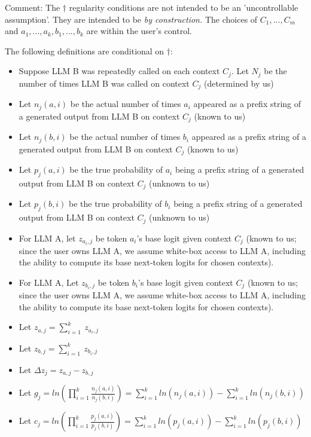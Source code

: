 \documentclass{article}
\begin{document}
Comment: The $\displaystyle \dagger $ regularity conditions are not intended to be an 'uncontrollable assumption'. They are intended to be \textit{by construction.} The choices of $\displaystyle C_{1} ,...,C_{m}$ and $\displaystyle a_{1} ,...,a_{k} ,b_{1} ,...,b_{k}$ are within the user's control.


The following definitions are conditional on $\displaystyle \dagger $:

\begin{itemize}
\item Suppose LLM B was repeatedly called on each context $\displaystyle C_{j}$. Let $\displaystyle N_{j}$ be the number of times LLM B was called on context $\displaystyle C_{j}$ (determined by us)
\item Let $\displaystyle n_{j}( a,i)$ be the actual number of times $\displaystyle a_{i}$ appeared as a prefix string of a generated output from LLM B on context $\displaystyle C_{j}$ (known to us)
\item Let $\displaystyle n_{j}( b,i)$ be the actual number of times $\displaystyle b_{i}$ appeared as a prefix string of a generated output from LLM B on context $\displaystyle C_{j}$ (known to us)
\item Let $\displaystyle p_{j}( a,i)$ be the true probability of $\displaystyle a_{i}$ being a prefix string of a generated output from LLM B on context $\displaystyle C_{j}$ (unknown to us)
\item Let $\displaystyle p_{j}( b,i)$ be the true probability of $\displaystyle b_{i}$ being a prefix string of a generated output from LLM B on context $\displaystyle C_{j}$ (unknown to us)
\item For LLM A, let $\displaystyle z_{a_{i} ,j}$ be token $\displaystyle a_{i}$'s base logit given context $\displaystyle C_{j}$ (known to us; since the user owns LLM A, we assume white-box access to LLM A, including the ability to compute its base next-token logits for chosen contexts).
\item For LLM A, Let $\displaystyle z_{b_{i} ,j}$ be token $\displaystyle b_{i}$'s base logit given context $\displaystyle C_{j}$ (known to us; since the user owns LLM A, we assume white-box access to LLM A, including the ability to compute its base next-token logits for chosen contexts).
\item Let $\displaystyle z_{a,j} =\sum _{i=1}^{k} \ z_{a_{i} ,j}$
\item Let $\displaystyle z_{b,j} =\sum _{i=1}^{k} \ z_{b_{i} ,j}$
\item Let $\displaystyle \Delta z_{j} =z_{a,j} -z_{b,j}$
\item Let $\displaystyle g_{j} =ln\left(\prod _{i=1}^{k}\frac{n_{j}( a,i)}{n_{j}( b,i)}\right) =\sum _{i=1}^{k} ln( n_{j}( a,i)) -\sum _{i=1}^{k} ln( n_{j}( b,i))$
\item Let $\displaystyle c_{j} =ln\left(\prod _{i=1}^{k}\frac{p_{j}( a,i)}{p_{j}( b,i)}\right) =\sum _{i=1}^{k} ln( p_{j}( a,i)) -\sum _{i=1}^{k} ln( p_{j}( b,i))$
\end{itemize}
\end{document}
